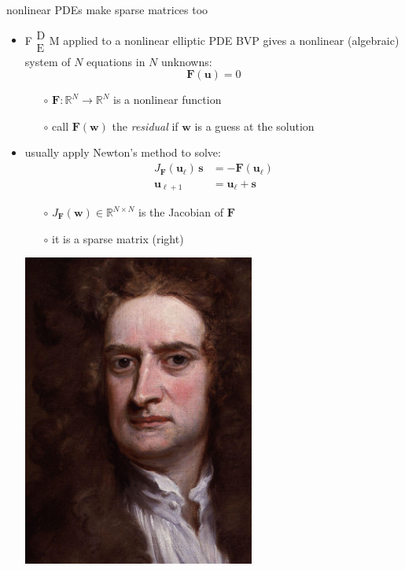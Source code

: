 \documentclass[hide notes,intlimits,usenames,dvipsnames]{beamer}
\newcommand{\RR}{\mathbb{R}}
\newcommand{\bs}{\mathbf{s}}
\newcommand{\bu}{\mathbf{u}}
\newcommand{\bw}{\mathbf{w}}
\newcommand{\FM}{F$\begin{smallmatrix} \text{D} \\ \text{E} \end{smallmatrix}$M\xspace}
\begin{document}
\begin{frame}{nonlinear PDEs make sparse matrices too}
\begin{itemize}
\item \FM applied to a nonlinear elliptic PDE BVP gives a nonlinear (algebraic) system of $N$ equations in $N$ unknowns:
    $$\mathbf{F}(\bu)=0$$
     \vspace{-4mm}
	\begin{itemize}
	\item[$\circ$] $\mathbf{F}:\RR^N\to\RR^N$ is a nonlinear function
	\item[$\circ$] call $\mathbf{F}(\bw)$ the \emph{residual} if $\bw$ is a guess at the solution
	\end{itemize}

\item \begin{minipage}[t]{70mm}
usually apply Newton's method to solve:
\begin{align*}
J_{\mathbf{F}}(\bu_\ell)\, \bs &= - \mathbf{F}(\bu_\ell)  \\
    \bu_{\ell+1} &= \bu_\ell + \bs
\end{align*}
    \vspace{-6mm}
	\begin{itemize}
	\item[$\circ$] $J_{\mathbf{F}}(\bw) \in \RR^{N\times N}$ is the Jacobian of $\mathbf{F}$
	\item[$\circ$] it is a sparse matrix (right)
	\end{itemize}
\end{minipage}
\quad
\begin{minipage}[t]{20mm}
\vspace{0mm}
\hfill \includegraphics[width=0.6\textwidth]{figs/newton}


\end{minipage}
\end{itemize}
\end{frame}
\end{document}
